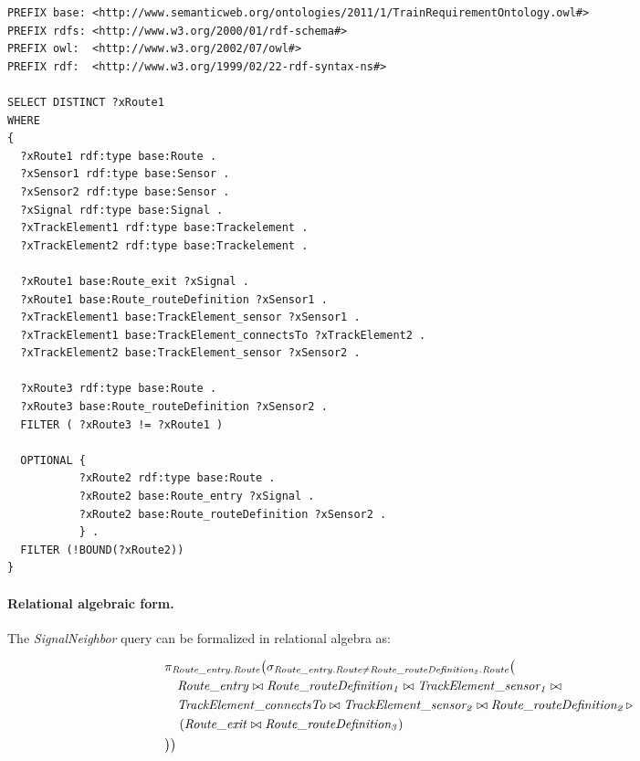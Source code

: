 \begin{lstlisting}[caption=The RouteSensor query in SPARQL, label=lst:signalneighbor-sparql]
PREFIX base: <http://www.semanticweb.org/ontologies/2011/1/TrainRequirementOntology.owl#>
PREFIX rdfs: <http://www.w3.org/2000/01/rdf-schema#>
PREFIX owl:  <http://www.w3.org/2002/07/owl#>
PREFIX rdf:  <http://www.w3.org/1999/02/22-rdf-syntax-ns#>

SELECT DISTINCT ?xRoute1
WHERE
{
  ?xRoute1 rdf:type base:Route .
  ?xSensor1 rdf:type base:Sensor .
  ?xSensor2 rdf:type base:Sensor .
  ?xSignal rdf:type base:Signal .
  ?xTrackElement1 rdf:type base:Trackelement .
  ?xTrackElement2 rdf:type base:Trackelement .
  
  ?xRoute1 base:Route_exit ?xSignal .
  ?xRoute1 base:Route_routeDefinition ?xSensor1 .
  ?xTrackElement1 base:TrackElement_sensor ?xSensor1 .
  ?xTrackElement1 base:TrackElement_connectsTo ?xTrackElement2 .
  ?xTrackElement2 base:TrackElement_sensor ?xSensor2 .
  
  ?xRoute3 rdf:type base:Route .
  ?xRoute3 base:Route_routeDefinition ?xSensor2 .
  FILTER ( ?xRoute3 != ?xRoute1 )
  
  OPTIONAL { 
           ?xRoute2 rdf:type base:Route .
           ?xRoute2 base:Route_entry ?xSignal .
           ?xRoute2 base:Route_routeDefinition ?xSensor2 .
           } .
  FILTER (!BOUND(?xRoute2))
}
\end{lstlisting}


\paragraph{Relational algebraic form.} The \textit{SignalNeighbor} query can be formalized in relational algebra as:

\begin{align*}
& \pi_{\mathit{Route\_entry.Route}} \big( \sigma_{\mathit{Route\_entry.Route} \neq \mathit{Route\_routeDefinition_2.Route}} \big( \\
& \quad \mathit{Route\_entry} \bowtie \mathit{Route\_routeDefinition_1} \bowtie \mathit{TrackElement\_sensor_1} \bowtie \\
& \quad \mathit{TrackElement\_connectsTo} \bowtie \mathit{TrackElement\_sensor_2} \bowtie \mathit{Route\_routeDefinition_2} \, \triangleright \, \\
& \quad \left( \mathit{Route\_exit} \bowtie \mathit{Route\_routeDefinition_3} \right) \\
& \big) \big)
\end{align*}

